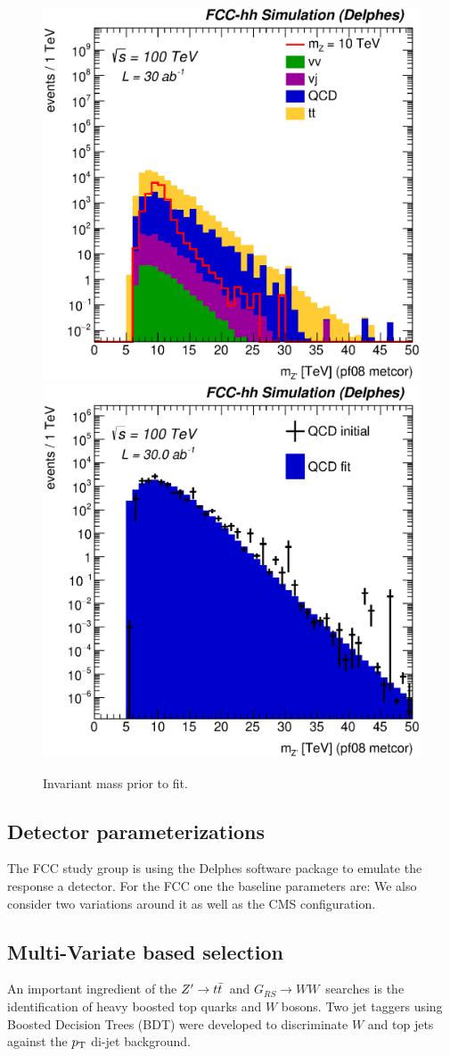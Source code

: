 \documentclass{cernrep}
\newcommand*{\zptt}{\ensuremath{Z^{\prime} \rightarrow \ttbar}}
\newcommand*{\rsg}{\ensuremath{G_{RS} \rightarrow WW}}
\begin{document}
\begin{figure}[!htb]\centering
\includegraphics[width=0.45\columnwidth]{Fig/Zptt/Mj1j2_pf08_MetCorr_sel8_nostack_log.eps}
\includegraphics[width=0.45\columnwidth]{Fig/Zptt/Zptt_QCD_sel8_Mj1j2_pf08_MetCorr_fit.eps}
\caption{Invariant mass prior to fit.}
\label{fig:hadronicresonances_nofit}
\end{figure}

\subsection{Detector parameterizations}
\label{subsec:detparam}

The FCC study group is using the Delphes software package to emulate the response a detector. 
For the FCC one the baseline parameters are:
We also consider two variations around it as well as the CMS configuration.


\subsection{Multi-Variate based selection}
\label{subsec:mvatagger}

An important ingredient of the \zptt\ and \rsg\ searches is the identification of heavy boosted top quarks and $W$ bosons. Two jet taggers using Boosted Decision Trees (BDT) were developed to discriminate $W$ and top jets against the $p_{\text{T}}$ di-jet background.
\end{document}
